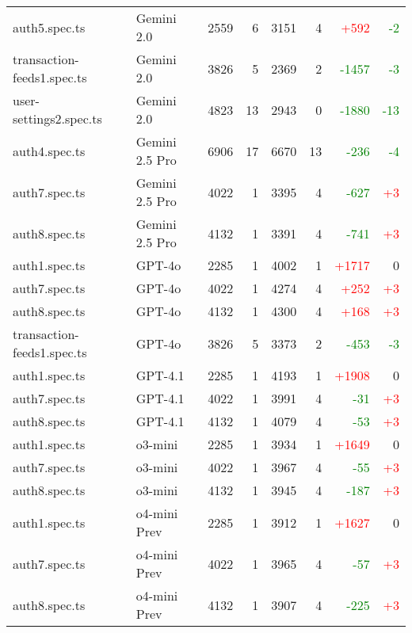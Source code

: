 \begin{table}[htbp]
\begin{tabular}{|p{3.5cm}|p{2.5cm}|r|r|r|r|r|r|}
auth5.spec.ts & Gemini 2.0 & 2559 & 6 & 3151 & 4 & \textcolor{red}{+592} & \textcolor{green}{-2} \\
transaction-feeds1.spec.ts & Gemini 2.0 & 3826 & 5 & 2369 & 2 & \textcolor{green}{-1457} & \textcolor{green}{-3} \\
user-settings2.spec.ts & Gemini 2.0 & 4823 & 13 & 2943 & 0 & \textcolor{green}{-1880} & \textcolor{green}{-13} \\
\hline
auth4.spec.ts & Gemini 2.5 Pro & 6906 & 17 & 6670 & 13 & \textcolor{green}{-236} & \textcolor{green}{-4} \\
auth7.spec.ts & Gemini 2.5 Pro & 4022 & 1 & 3395 & 4 & \textcolor{green}{-627} & \textcolor{red}{+3} \\
auth8.spec.ts & Gemini 2.5 Pro & 4132 & 1 & 3391 & 4 & \textcolor{green}{-741} & \textcolor{red}{+3} \\
\hline
auth1.spec.ts & GPT-4o & 2285 & 1 & 4002 & 1 & \textcolor{red}{+1717} & 0 \\
auth7.spec.ts & GPT-4o & 4022 & 1 & 4274 & 4 & \textcolor{red}{+252} & \textcolor{red}{+3} \\
auth8.spec.ts & GPT-4o & 4132 & 1 & 4300 & 4 & \textcolor{red}{+168} & \textcolor{red}{+3} \\
transaction-feeds1.spec.ts & GPT-4o & 3826 & 5 & 3373 & 2 & \textcolor{green}{-453} & \textcolor{green}{-3} \\
\hline
auth1.spec.ts & GPT-4.1 & 2285 & 1 & 4193 & 1 & \textcolor{red}{+1908} & 0 \\
auth7.spec.ts & GPT-4.1 & 4022 & 1 & 3991 & 4 & \textcolor{green}{-31} & \textcolor{red}{+3} \\
auth8.spec.ts & GPT-4.1 & 4132 & 1 & 4079 & 4 & \textcolor{green}{-53} & \textcolor{red}{+3} \\
\hline
auth1.spec.ts & o3-mini & 2285 & 1 & 3934 & 1 & \textcolor{red}{+1649} & 0 \\
auth7.spec.ts & o3-mini & 4022 & 1 & 3967 & 4 & \textcolor{green}{-55} & \textcolor{red}{+3} \\
auth8.spec.ts & o3-mini & 4132 & 1 & 3945 & 4 & \textcolor{green}{-187} & \textcolor{red}{+3} \\
\hline
auth1.spec.ts & o4-mini Prev & 2285 & 1 & 3912 & 1 & \textcolor{red}{+1627} & 0 \\
auth7.spec.ts & o4-mini Prev & 4022 & 1 & 3965 & 4 & \textcolor{green}{-57} & \textcolor{red}{+3} \\
auth8.spec.ts & o4-mini Prev & 4132 & 1 & 3907 & 4 & \textcolor{green}{-225} & \textcolor{red}{+3} \\

\end{tabular}
\end{table}
